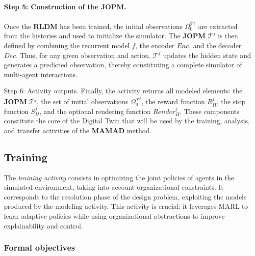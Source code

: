 \documentclass[pdflatex,sn-mathphys-num]{sn-jnl}%
\theoremstyle{thmstyleone}%
\theoremstyle{thmstyletwo}%
\theoremstyle{thmstylethree}%
\begin{document}
\paragraph*{Step 5: Construction of the JOPM.}
Once the \textbf{RLDM} has been trained, the initial observations $\Omega^{\mathcal {T}^j}_0$ are extracted from the histories and used to initialize the simulator.
The \textbf{JOPM} $\mathcal{T}^j$ is then defined by combining the recurrent model $f$, the encoder $Enc$, and the decoder $Dec$.
Thus, for any given observation and action, $\mathcal{T}^j$ updates the hidden state and generates a predicted observation, thereby constituting a complete simulator of multi-agent interactions.

Step 6: Activity outputs.
Finally, the activity returns all modeled elements: the \textbf{JOPM} $\mathcal{T}^j$, the set of initial observations $\Omega^{\mathcal{T}^j}_0$, the reward function $R^j_H$, the stop function $S^j_H$, and the optional rendering function $Render^j_H$.
These components constitute the core of the Digital Twin that will be used by the training, analysis, and transfer activities of the \textbf{MAMAD} method.



\subsection{Training}\label{sec:training}

The \textit{training activity} consists in optimizing the joint policies of agents in the simulated environment, taking into account organizational constraints.
It corresponds to the resolution phase of the design problem, exploiting the models produced by the modeling activity.
This activity is crucial: it leverages MARL to learn adaptive policies while using organizational abstractions to improve explainability and control.

\subsubsection*{Formal objectives}
\end{document}

